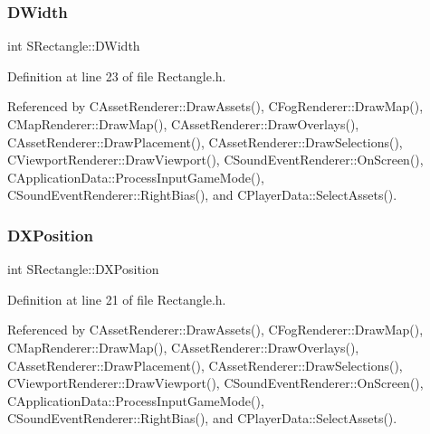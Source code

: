 \hypertarget{structSRectangle_a4150898b3f7d90f6e4b0d44bf1ae3bd2}{}\label{structSRectangle_a4150898b3f7d90f6e4b0d44bf1ae3bd2} 
\subsubsection{\texorpdfstring{D\+Width}{DWidth}}
{\footnotesize\ttfamily int S\+Rectangle\+::\+D\+Width}



Definition at line 23 of file Rectangle.\+h.



Referenced by C\+Asset\+Renderer\+::\+Draw\+Assets(), C\+Fog\+Renderer\+::\+Draw\+Map(), C\+Map\+Renderer\+::\+Draw\+Map(), C\+Asset\+Renderer\+::\+Draw\+Overlays(), C\+Asset\+Renderer\+::\+Draw\+Placement(), C\+Asset\+Renderer\+::\+Draw\+Selections(), C\+Viewport\+Renderer\+::\+Draw\+Viewport(), C\+Sound\+Event\+Renderer\+::\+On\+Screen(), C\+Application\+Data\+::\+Process\+Input\+Game\+Mode(), C\+Sound\+Event\+Renderer\+::\+Right\+Bias(), and C\+Player\+Data\+::\+Select\+Assets().

\hypertarget{structSRectangle_abcbddb03b3ee416cc33109833b5f075c}{}\label{structSRectangle_abcbddb03b3ee416cc33109833b5f075c} 
\subsubsection{\texorpdfstring{D\+X\+Position}{DXPosition}}
{\footnotesize\ttfamily int S\+Rectangle\+::\+D\+X\+Position}



Definition at line 21 of file Rectangle.\+h.



Referenced by C\+Asset\+Renderer\+::\+Draw\+Assets(), C\+Fog\+Renderer\+::\+Draw\+Map(), C\+Map\+Renderer\+::\+Draw\+Map(), C\+Asset\+Renderer\+::\+Draw\+Overlays(), C\+Asset\+Renderer\+::\+Draw\+Placement(), C\+Asset\+Renderer\+::\+Draw\+Selections(), C\+Viewport\+Renderer\+::\+Draw\+Viewport(), C\+Sound\+Event\+Renderer\+::\+On\+Screen(), C\+Application\+Data\+::\+Process\+Input\+Game\+Mode(), C\+Sound\+Event\+Renderer\+::\+Right\+Bias(), and C\+Player\+Data\+::\+Select\+Assets().

\hypertarget{structSRectangle_a120aa0a90033bc6e07c36c151a3bbc71}{}\label{structSRectangle_a120aa0a90033bc6e07c36c151a3bbc71} 
